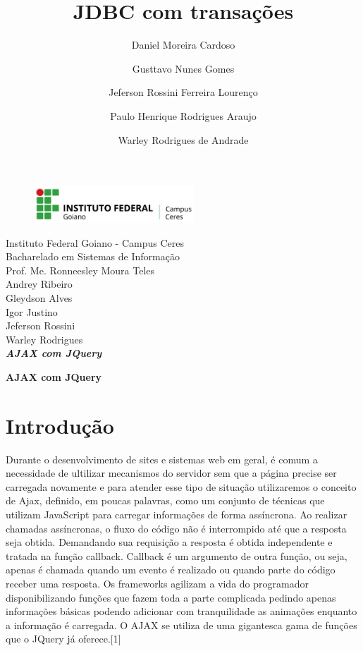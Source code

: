 \documentclass[12pt,a4paper]{article}
\title{JDBC com transações}
\author{Daniel Moreira Cardoso \and Gusttavo Nunes Gomes\and Jeferson Rossini Ferreira Lourenço\and Paulo Henrique Rodrigues Araujo\and Warley Rodrigues de Andrade}
\begin{document}
\begin{titlepage}
\begin{center}
\begin{figure}[htb]
                
                \label{figura:LogoIF}
        
                \centering
                \includegraphics[width=6cm]{recursos/imagens/logo.png} 
\end{figure}
Instituto Federal Goiano - Campus Ceres\\
Bacharelado em Sistemas de Informação\\
Prof. Me. Ronneesley Moura Teles\\\vspace{0.5cm}
Andrey Ribeiro \\
Gleydson Alves\\
Igor Justino\\
Jeferson Rossini\\
Warley Rodrigues\\
\vspace{5.0cm}
\textit{\textbf{\Large{AJAX com JQuery}}}\\\vspace{0.5cm}
\vspace{9.5cm}
\end{center}
\end{titlepage}
\tableofcontents
\newpage
\begin{center}
\textbf{\Large{AJAX com JQuery}}\\\vspace{0.5cm}
\end{center}
\section{Introdução}
Durante o desenvolvimento de sites e sistemas web em geral, é comum a necessidade de ultilizar mecanismos do servidor sem que a página precise ser carregada novamente e para atender esse tipo de situação utilizaremos o conceito de Ajax, definido, em poucas palavras, como um conjunto de técnicas que utilizam JavaScript para carregar informações de forma assíncrona.
Ao realizar chamadas assíncronas, o fluxo do código não é interrompido até que a resposta seja obtida. Demandando sua requisição a resposta é obtida independente e tratada na função callback. Callback é um argumento de outra função, ou seja, apenas é chamada quando um evento é realizado ou quando parte do código receber uma resposta.
Os frameworks agilizam a vida do programador disponibilizando funções que fazem toda a parte complicada pedindo apenas informações básicas podendo adicionar com tranquilidade as animações enquanto a informação é carregada. O AJAX se utiliza de uma gigantesca gama de funções que o JQuery já oferece.[1]
\end{document}
